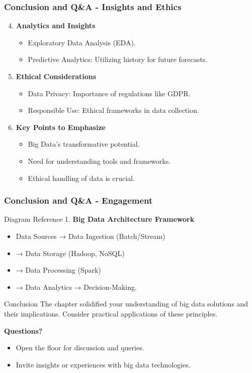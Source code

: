 \documentclass[aspectratio=169]{beamer}
\begin{document}
\begin{frame}[fragile]
    \frametitle{Conclusion and Q\&A - Insights and Ethics}
    \begin{enumerate}
        \setcounter{enumi}{3}
        \item \textbf{Analytics and Insights}
        \begin{itemize}
            \item Exploratory Data Analysis (EDA).
            \item Predictive Analytics: Utilizing history for future forecasts.
        \end{itemize}
        
        \item \textbf{Ethical Considerations}
        \begin{itemize}
            \item Data Privacy: Importance of regulations like GDPR.
            \item Responsible Use: Ethical frameworks in data collection.
        \end{itemize}
        
        \item \textbf{Key Points to Emphasize}
        \begin{itemize}
            \item Big Data's transformative potential.
            \item Need for understanding tools and frameworks.
            \item Ethical handling of data is crucial.
        \end{itemize}
    \end{enumerate}
\end{frame}

\begin{frame}[fragile]
    \frametitle{Conclusion and Q\&A - Engagement}
    \begin{block}{Diagram Reference}
        1. \textbf{Big Data Architecture Framework}
        \begin{itemize}
            \item Data Sources → Data Ingestion (Batch/Stream) 
            \item → Data Storage (Hadoop, NoSQL) 
            \item → Data Processing (Spark) 
            \item → Data Analytics → Decision-Making.
        \end{itemize}
    \end{block}

    \begin{block}{Conclusion}
        The chapter solidified your understanding of big data solutions and their implications. Consider practical applications of these principles.
    \end{block}

    \textbf{Questions?}
    \begin{itemize}
        \item Open the floor for discussion and queries.
        \item Invite insights or experiences with big data technologies.
    \end{itemize}
\end{frame}
\end{document}
